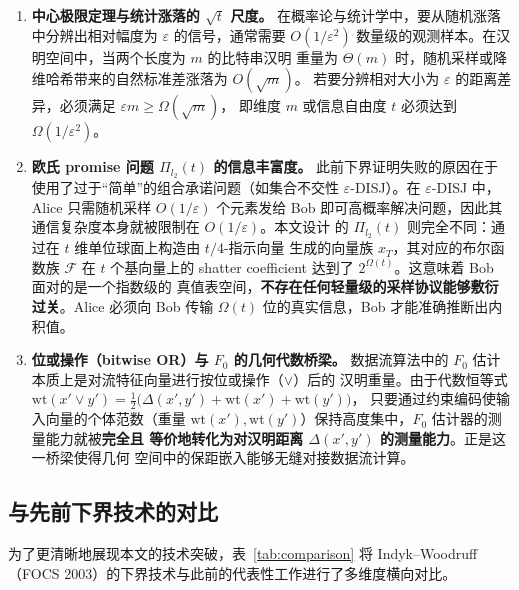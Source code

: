 \documentclass[UTF8, 11pt, a4paper, linestretch=1.15]{ctexart}
\theoremstyle{zhstyle}
\newcommand{\eps}{\varepsilon}
\newcommand{\Fzero}{F_0}
\begin{document}
	\begin{enumerate}
		\item \textbf{中心极限定理与统计涨落的 $\sqrt{t}$ 尺度。}
		在概率论与统计学中，要从随机涨落中分辨出相对幅度为 $\eps$ 的信号，通常需要
		$O(1/\eps^2)$ 数量级的观测样本。在汉明空间中，当两个长度为 $m$ 的比特串汉明
		重量为 $\Theta(m)$ 时，随机采样或降维哈希带来的自然标准差涨落为 $O(\sqrt{m})$。
		若要分辨相对大小为 $\eps$ 的距离差异，必须满足 $\eps m \geq \Omega(\sqrt{m})$，
		即维度 $m$ 或信息自由度 $t$ 必须达到 $\Omega(1/\eps^2)$。
		\item \textbf{欧氏 promise 问题 $\Pi_{l_2}(t)$ 的信息丰富度。}
		此前下界证明失败的原因在于使用了过于“简单”的组合承诺问题（如集合不交性
		$\eps$-DISJ）。在 $\eps$-DISJ 中，Alice 只需随机采样 $O(1/\eps)$ 个元素发给
		Bob 即可高概率解决问题，因此其通信复杂度本身就被限制在 $O(1/\eps)$。本文设计
		的 $\Pi_{l_2}(t)$ 则完全不同：通过在 $t$ 维单位球面上构造由 $t/4$-指示向量
		生成的向量族 $x_T$，其对应的布尔函数族 $\mathcal{F}$ 在 $t$ 个基向量上的
		shatter coefficient 达到了 $2^{\Omega(t)}$。这意味着 Bob 面对的是一个指数级的
		真值表空间，\textbf{不存在任何轻量级的采样协议能够敷衍过关}。Alice 必须向
		Bob 传输 $\Omega(t)$ 位的真实信息，Bob 才能准确推断出内积值。
		\item \textbf{位或操作（bitwise OR）与 $\Fzero$ 的几何代数桥梁。}
		数据流算法中的 $\Fzero$ 估计本质上是对流特征向量进行按位或操作（$\lor$）后的
		汉明重量。由于代数恒等式
		$\mathrm{wt}(x' \lor y') = \frac{1}{2}\big(\Delta(x', y') + \mathrm{wt}(x')
		+ \mathrm{wt}(y')\big)$，
		只要通过约束编码使输入向量的个体范数（重量 $\mathrm{wt}(x'),
		\mathrm{wt}(y')$）保持高度集中，$\Fzero$ 估计器的测量能力就被\textbf{完全且
			等价地转化为对汉明距离 $\Delta(x', y')$ 的测量能力}。正是这一桥梁使得几何
		空间中的保距嵌入能够无缝对接数据流计算。
	\end{enumerate}
	
	\subsection{与先前下界技术的对比}
	
	为了更清晰地展现本文的技术突破，表~\ref{tab:comparison} 将 Indyk--Woodruff
	（FOCS 2003）的下界技术与此前的代表性工作进行了多维度横向对比。
	
\end{document}
